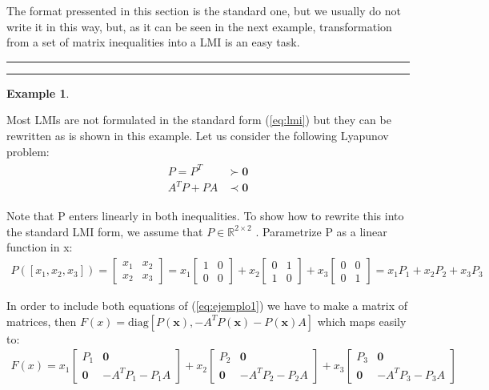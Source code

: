 \documentclass[nols]{tufte-handout}
\theoremstyle{definition}
\newtheorem{exmp}{Example}[section]
\begin{document}
The format pressented in this section is the standard one, but we usually do not write it in this way, but, as it can be seen in the next example, transformation from a set of matrix inequalities into a LMI is an easy task.

\vspace{0.5cm} 
\hrule
\hrule
\begin{exmp}\label{lmi}

Most LMIs are not formulated in the standard form (\ref{eq:lmi}) but
they can be rewritten as is shown in this example. Let us consider the following
Lyapunov problem:
\begin{align}\label{eq:ejemplo1}
        \begin{array}{rl}
            P=P^T  & \succ \mathbf{0}\\
            A^TP+PA & \prec \mathbf{0}
        \end{array}    
\end{align}

Note that P enters linearly in both inequalities. To show how to rewrite this
into the standard LMI form, we assume that $P \in  \mathbb{R}^{2\times 2}$ . Parametrize P as a
linear function in x:
\begin{align}
    P(\left[x_1,x_2,x_3\right])=\begin{bmatrix}
        x_1 & x_2\\
        x_2 & x_3
    \end{bmatrix}=x_1 
    \begin{bmatrix}
        1 & 0 \\
        0 & 0
    \end{bmatrix}+x_2
    \begin{bmatrix}
        0 & 1\\
        1 & 0
    \end{bmatrix}+
    x_3
    \begin{bmatrix}
        0 & 0\\
        0 & 1
    \end{bmatrix}=x_1P_1+x_2P_2+x_3P_3
\end{align}

In order to include both equations of (\ref{eq:ejemplo1}) we have to make a matrix of matrices, then $F(x)=\text{diag}\left[P(\mathbf{x}), -A^TP(\mathbf{x})-P(\mathbf{x})A\right]$ which maps easily to:
        \begin{align}
           F(x)=x_1 
            \begin{bmatrix}
                P_1 & \mathbf{0}\\
                \mathbf{0} &-A^TP_1-P_1A
            \end{bmatrix}
            +x_2 \begin{bmatrix}
                P_2 & \mathbf{0}\\
                \mathbf{0} &-A^TP_2-P_2A
            \end{bmatrix}
            +x_3 \begin{bmatrix}
                P_3 & \mathbf{0}\\
                \mathbf{0} &-A^TP_3-P_3A
            \end{bmatrix}
        \end{align}


\end{exmp}
\end{document}

